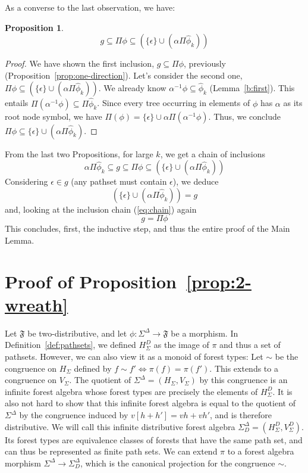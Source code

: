\documentclass[sigplan,9pt]{acmart}\settopmatter{printfolios=true,printccs=false,printacmref=false}
\newcounter{thm}
\newcounter{theorem}
\theoremstyle{definition}
\newtheorem{prop}[thm]{Proposition}
\newcommand{\Ff}[0]{{\mathfrak{F}}}
\newcommand{\freedisth}[0]{{H_\Sigma^D}}
\begin{document}
As a converse to the last observation, we have:
\begin{prop}
$$g \subseteq \Pi \phi \subseteq \left(\{\epsilon\} \cup (\alpha \Pi \widehat{\phi}_k)\right)$$
\end{prop}

\begin{proof}
We have shown the first inclusion, $g \subseteq \Pi \phi$, previously (Proposition~\ref{prop:one-direction}).
Let's consider the second one, $\Pi \phi \subseteq \left(\{\epsilon\} \cup (\alpha \Pi \widehat{\phi}_k)\right)$.
We already know $\alpha^{-1}\phi \subseteq \widehat{\phi}_k$ (Lemma~\ref{b:first}).
This entails $\Pi(\alpha^{-1}\phi) \subseteq \Pi\widehat{\phi}_k$.
Since every tree occurring in elements of $\phi$ has $\alpha$ as its root node symbol, we have $\Pi(\phi) = \{\epsilon\} \cup \alpha\Pi(\alpha^{-1}\phi)$.
Thus, we conclude $\Pi \phi \subseteq \{\epsilon\} \cup (\alpha \Pi \widehat{\phi}_k)$.
\end{proof}

From the last two Propositions, for large $k$, we get a chain of inclusions
\begin{equation}\label{eq:chain}
\alpha\Pi\widehat{\phi}_k \subseteq g \subseteq \Pi \phi \subseteq \left(\{\epsilon\} \cup (\alpha \Pi \widehat{\phi}_k)\right)
\end{equation}
Considering $\epsilon \in g$ (any pathset must contain $\epsilon$), we deduce $$\left(\{\epsilon\} \cup (\alpha\Pi\widehat{\phi}_k)\right) = g$$
and, looking at the inclusion chain (\ref{eq:chain}) again $$g = \Pi \phi$$
This concludes, first, the inductive step, and thus the entire proof of the Main Lemma.




\newpage
\section{Proof of Proposition~\ref{prop:2-wreath}}\label{sec:proof-2-wr}

Let $\Ff$ be two-distributive, and let $\phi : \Sigma^\Delta \rightarrow \Ff$ be a morphism.
In Definition~\ref{def:pathsets}, we defined $\freedisth$ as the image of $\pi$ and thus a set of pathsets.
However, we can also view it as a monoid of forest types:
Let $\sim$ be the congruence on $H_\Sigma$ defined by $f \sim f' \Leftrightarrow \pi(f) = \pi(f')$.
This extends to a congruence on $V_\Sigma$.
The quotient of $\Sigma^\Delta = (H_\Sigma, V_\Sigma)$ by this congruence is an infinite forest algebra whose forest types are precisely the elements of $\freedisth$.
It is also not hard to show that this infinite forest algebra is equal to the quotient of $\Sigma^\Delta$ by the congruence induced by $v[h+h'] = vh+vh'$, and is therefore distributive.
We will call this infinite distributive forest algebra $\Sigma^\Delta_D = (\freedisth, V_\Sigma^D)$.
Its forest types are equivalence classes of forests that have the same path set, and can thus be represented as finite path sets.
We can extend $\pi$ to a forest algebra morphism $\Sigma^\Delta \rightarrow \Sigma^\Delta_D$, which is the canonical projection for the congruence $\sim$.
\end{document}
